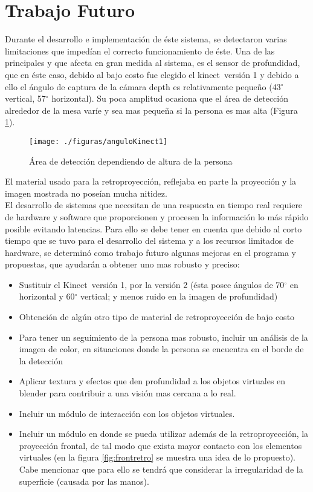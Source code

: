 \documentclass[a4paper,openright,12pt]{report}
\begin{document}
\section{Trabajo Futuro}
Durante el desarrollo e implementación de éste sistema, se detectaron varias limitaciones que impedían el correcto funcionamiento de éste. Una de las principales y que afecta en gran medida al sistema, es el sensor de profundidad, que en éste caso, debido al bajo costo fue elegido el kinect\textcopyright\ versión 1 y debido a ello el ángulo de captura de la cámara depth es relativamente pequeño (43$^{\circ}$ vertical, 57$^{\circ}$ horizontal). Su poca amplitud ocasiona que el área de detección alrededor de la mesa varíe y sea mas pequeña si la persona es mas alta (Figura \ref{fig:anguloKinect1}). 
\begin{figure}[H]
	\centering
	\texttt{[image: ./figuras/anguloKinect1]}
	\caption{Área de detección dependiendo de altura de la persona}\label{fig:anguloKinect1}
\end{figure}
El material usado para la retroproyección, reflejaba en parte la proyección y la imagen mostrada no poseían mucha nitidez.\\
El desarrollo de sistemas que necesitan de una respuesta en tiempo real requiere de hardware y software que proporcionen y procesen la información lo más rápido posible evitando latencias. Para ello se debe tener en cuenta que debido al corto tiempo que se tuvo para el desarrollo del sistema y a los recursos limitados de hardware, se determinó como trabajo futuro algunas mejoras en el programa y propuestas, que ayudarán a obtener uno mas robusto y preciso: 
\begin{itemize}
	\item Sustituir el Kinect\textcopyright\ versión 1, por la versión 2 (ésta posee ángulos de 70$^{\circ}$ en horizontal y 60$^{\circ}$ vertical; y menos ruido en la imagen de profundidad)
	\item Obtención de algún otro tipo de material de retroproyección de bajo costo
	\item Para tener un seguimiento de la persona mas robusto, incluir un análisis de la imagen de color, en situaciones donde la persona se encuentra en el borde de la detección
	\item Aplicar textura y efectos que den profundidad a los objetos virtuales en blender para contribuir a una visión mas cercana a lo real.
	\item Incluir un módulo de interacción con los objetos virtuales.
	\item Incluir un módulo en donde se pueda utilizar además de la retroproyección, la proyección frontal, de tal modo que exista mayor contacto con los elementos virtuales (en la figura \ref{fig:frontretro} se muestra una idea de lo propuesto). Cabe mencionar que para ello se tendrá que considerar la irregularidad de la superficie (causada por las manos).
\end{itemize}
\end{document}

